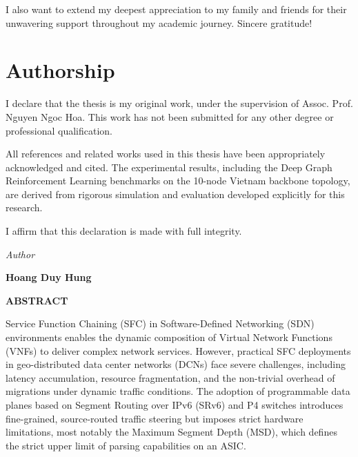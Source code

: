 \documentclass[12pt, a4paper, reqno, oneside]{book}
\newcommand \chap[1]{%
  \chapter*{#1}%
  \addcontentsline{toc}{chapter}{#1}
  \markboth{#1}{}
}
\begin{document}
I also want to extend my deepest appreciation to my family and friends for their unwavering support throughout my academic journey. Sincere gratitude!

\newpage
\chap{Authorship}
\vspace{20pt}
I declare that the thesis is my original work, under the supervision of Assoc. Prof. Nguyen Ngoc Hoa. This work has not been submitted for any other degree or professional qualification.

All references and related works used in this thesis have been appropriately acknowledged and cited. The experimental results, including the Deep Graph Reinforcement Learning benchmarks on the 10-node Vietnam backbone topology, are derived from rigorous simulation and evaluation developed explicitly for this research.

I affirm that this declaration is made with full integrity.

\begin{flushright}
{\it Author}
\hskip 1.5cm\quad

\vskip 2cm
{\bf Hoang Duy Hung}  \quad\ 
\end{flushright}






\newpage
\begin{center}
\vspace*{2cm}
{\Large \bf ABSTRACT}
\vspace{10pt}
\end{center}

Service Function Chaining (SFC) in Software-Defined Networking (SDN) environments enables the dynamic composition of Virtual Network Functions (VNFs) to deliver complex network services. However, practical SFC deployments in geo-distributed data center networks (DCNs) face severe challenges, including latency accumulation, resource fragmentation, and the non-trivial overhead of migrations under dynamic traffic conditions. The adoption of programmable data planes based on Segment Routing over IPv6 (SRv6) and P4 switches introduces fine-grained, source-routed traffic steering but imposes strict hardware limitations, most notably the Maximum Segment Depth (MSD), which defines the strict upper limit of parsing capabilities on an ASIC.
\end{document}
